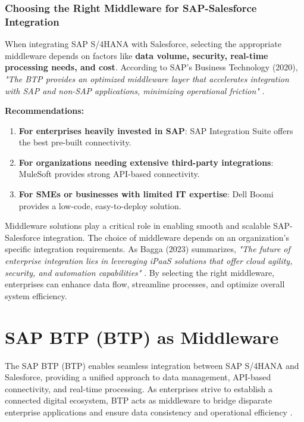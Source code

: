 \subsubsection{Choosing the Right Middleware for SAP-Salesforce Integration}
When integrating SAP S/4HANA with Salesforce, selecting the appropriate middleware depends on factors like \textbf{data volume, security, real-time processing needs, and cost}. According to SAP's Business Technology (2020), \textit{"The BTP provides an optimized middleware layer that accelerates integration with SAP and non-SAP applications, minimizing operational friction"} \cite{sap2020}.

\textbf{Recommendations:}
\begin{enumerate}
\item \textbf{For enterprises heavily invested in SAP}: SAP Integration Suite offers the best pre-built connectivity.
\item \textbf{For organizations needing extensive third-party integrations}: MuleSoft provides strong API-based connectivity.
\item \textbf{For SMEs or businesses with limited IT expertise}: Dell Boomi provides a low-code, easy-to-deploy solution.
\end{enumerate}

Middleware solutions play a critical role in enabling smooth and scalable SAP-Salesforce integration. The choice of middleware depends on an organization’s specific integration requirements. As Bagga (2023) summarizes, \textit{"The future of enterprise integration lies in leveraging iPaaS solutions that offer cloud agility, security, and automation capabilities"} \cite{bagga2023}. By selecting the right middleware, enterprises can enhance data flow, streamline processes, and optimize overall system efficiency.


\section{SAP BTP (BTP) as Middleware}

The SAP BTP (BTP) enables seamless integration between SAP S/4HANA and Salesforce, providing a unified approach to data management, API-based connectivity, and real-time processing. As enterprises strive to establish a connected digital ecosystem, BTP acts as middleware to bridge disparate enterprise applications and ensure data consistency and operational efficiency \cite{sap2020}.

